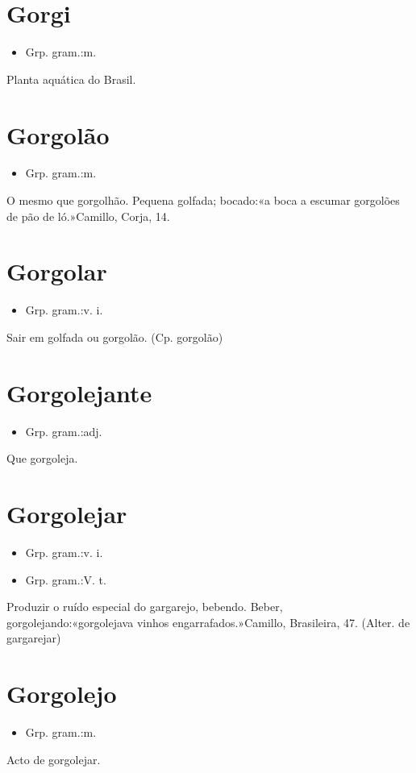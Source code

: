 \section{Gorgi}
\begin{itemize}
\item {Grp. gram.:m.}
\end{itemize}
Planta aquática do Brasil.
\section{Gorgolão}
\begin{itemize}
\item {Grp. gram.:m.}
\end{itemize}
O mesmo que \textunderscore gorgolhão\textunderscore .
Pequena golfada; bocado:«\textunderscore a boca a escumar gorgolões de pão de ló.\textunderscore »Camillo, \textunderscore Corja\textunderscore , 14.
\section{Gorgolar}
\begin{itemize}
\item {Grp. gram.:v. i.}
\end{itemize}
Sair em golfada ou gorgolão.
(Cp. \textunderscore gorgolão\textunderscore )
\section{Gorgolejante}
\begin{itemize}
\item {Grp. gram.:adj.}
\end{itemize}
Que gorgoleja.
\section{Gorgolejar}
\begin{itemize}
\item {Grp. gram.:v. i.}
\end{itemize}
\begin{itemize}
\item {Grp. gram.:V. t.}
\end{itemize}
Produzir o ruído especial do gargarejo, bebendo.
Beber, gorgolejando:«\textunderscore gorgolejava vinhos engarrafados.\textunderscore »Camillo, \textunderscore Brasileira\textunderscore , 47.
(Alter. de \textunderscore gargarejar\textunderscore )
\section{Gorgolejo}
\begin{itemize}
\item {Grp. gram.:m.}
\end{itemize}
Acto de gorgolejar.
